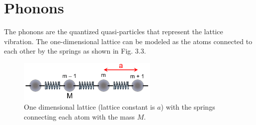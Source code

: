 \section{Phonons}
The phonons are the quantized quasi-particles that represent the lattice vibration. The one-dimensional lattice can be modeled as the atoms connected to each other by the springs as shown in Fig. 3.3.
\begin{figure}[tbp]
\includegraphics[width=0.6\textwidth]{figures/Fig3_3}
\centering
\caption{\small One dimensional lattice (lattice constant is $a$) with the springs connecting each atom with the mass $M$.}
\end{figure}
